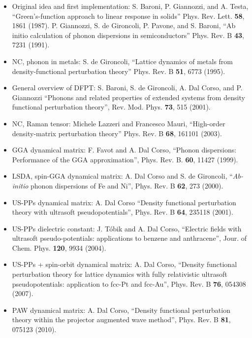 \documentclass[12pt,a4paper]{article}
\begin{document}
\begin{itemize}
\item
Original idea and first implementation: 
S. Baroni, P. Giannozzi, and A. Testa, 
``Green’s-function approach to linear response in solids''
Phys. Rev. Lett.  {\bf 58}, 1861 (1987).
P. Giannozzi, S. de Gironcoli, P. Pavone, and S. Baroni,
``Ab initio calculation of phonon dispersions in semiconductors''
Phys. Rev. B {\bf 43}, 7231 (1991).

\item
NC, phonon in metals: 
S. de Gironcoli, 
``Lattice dynamics of metals from density-functional perturbation theory''
Phys. Rev. B {\bf 51}, 6773 (1995).

\item
General overview of DFPT: 
S. Baroni, S. de Gironcoli, A. Dal Corso, and P. Giannozzi
``Phonons and related properties of extended systems from density
functional perturbation theory'', Rev. Mod. Phys. {\bf 73}, 515 (2001).

\item
NC, Raman tensor:
Michele Lazzeri and Francesco Mauri,
``High-order density-matrix perturbation theory''
Phys. Rev. B {\bf 68}, 161101 (2003).

\item
GGA dynamical matrix:
F. Favot and A. Dal Corso,
``Phonon dispersions: Performance of the GGA approximation'',
Phys. Rev. B. {\bf 60}, 11427 (1999).

\item
LSDA, spin-GGA dynamical matrix:
A. Dal Corso and S. de Gironcoli,
 ``{\it Ab-initio} phonon dispersions of Fe and Ni'',
Phys. Rev. B {\bf 62}, 273 (2000).

\item
US-PPs dynamical matrix:
A. Dal Corso
``Density functional perturbation theory with ultrasoft pseudopotentials'',
Phys. Rev. B {\bf 64}, 235118 (2001).

\item 
US-PPs dielectric constant:
J. T\'obik and A. Dal Corso,
``Electric fields with ultrasoft pseudo-potentials: applications to
benzene and anthracene'', Jour. of Chem. Phys. {\bf 120}, 9934 (2004).

\item 
US-PPs + spin-orbit dynamical matrix:
A. Dal Corso, ``Density functional perturbation theory for lattice
dynamics with fully relativistic ultrasoft pseudopotentials: application
to fcc-Pt and fcc-Au'', Phys. Rev. B {\bf 76}, 054308 (2007).

\item 
PAW dynamical matrix:
A. Dal Corso,
``Density functional perturbation theory within the projector augmented wave
method'', Phys. Rev. B {\bf 81}, 075123 (2010).


\end{itemize}
\end{document}
